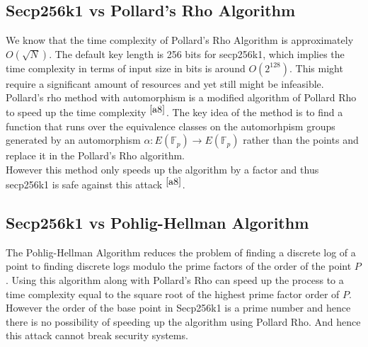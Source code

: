 \subsection{Secp256k1 vs Pollard's Rho Algorithm}
We know that the time complexity of Pollard's Rho Algorithm is approximately $O(\sqrt{N})$. The default key length is 256 bits for secp256k1, which implies the time complexity in terms of input size in bits is around $O(2^{128})$. This might require a significant amount of resources and yet still might be infeasible.\\
Pollard's rho method with automorphism is a modified algorithm of Pollard Rho to speed up the time complexity $^{\cite{a8}}$. %
The key idea of the method is to find a function that runs over the equivalence
classes on the automorhpism groups generated by an automorphism $\alpha: E(\mathbb{F}_p) \rightarrow E(\mathbb{F}_p)$ rather than the points and replace it in the Pollard’s Rho algorithm.\\
However this method only speeds up the algorithm by a factor and thus secp256k1 is safe against this attack $^{\cite{a8}}$. %

\subsection{Secp256k1 vs Pohlig-Hellman Algorithm}
The Pohlig-Hellman Algorithm reduces the problem of finding a discrete log of a point to finding discrete logs modulo the prime factors of the order of the point $P$. Using this algorithm along with Pollard's Rho can speed up the process to a time complexity equal to the square root of the highest prime factor order of $P$.\\
However the order of the base point in Secp256k1 is a prime number and hence there is no possibility of speeding up the algorithm using Pollard Rho. And hence this attack cannot break security systems.

